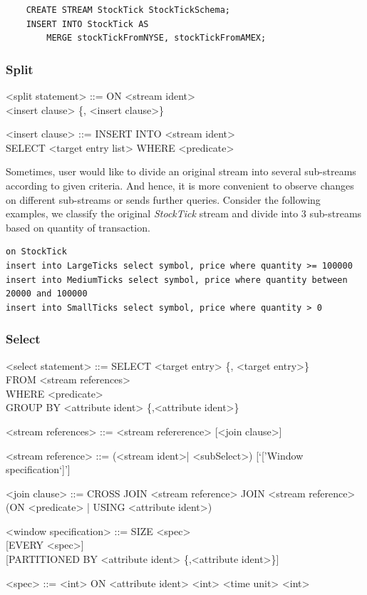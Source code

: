\begin{verbatim}
	CREATE STREAM StockTick StockTickSchema;
	INSERT INTO StockTick AS 
		MERGE stockTickFromNYSE, stockTickFromAMEX;
\end{verbatim}


\subsubsection{Split}
\begin{grammar}
<split statement> ::= ON <stream ident> \\
						<insert clause> \{, <insert clause>\}
						
<insert clause> ::= INSERT INTO <stream ident> \\SELECT <target entry list> WHERE <predicate>
\end{grammar}

Sometimes, user would like to divide an original stream into several sub-streams according to given criteria. And hence, it is more convenient to observe changes on different sub-streams or sends further queries. Consider the following examples, we classify the original \textit{StockTick} stream and divide into 3 sub-streams based on quantity of transaction.

\begin{verbatim}
on StockTick
insert into LargeTicks select symbol, price where quantity >= 100000
insert into MediumTicks select symbol, price where quantity between 20000 and 100000
insert into SmallTicks select symbol, price where quantity > 0
\end{verbatim}

\subsubsection{Select}
\begin{grammar}
<select statement> ::= SELECT <target entry> \{, <target entry>\}\\
	FROM <stream references> \\
	WHERE <predicate> \\
	GROUP BY <attribute ident> \{,<attribute ident>\}
	
<stream references> ::= <stream refererence> [<join clause>]

<stream reference> ::= (<stream ident>| <subSelect>) [`['Window specification`]']

<join clause> ::= CROSS JOIN <stream reference>
				\alt [INNER] JOIN <stream  reference> (ON <predicate> | USING <attribute ident>)

<window specification> ::= 
								SIZE <spec> \\
								{ }[EVERY <spec>]\\
								{ }[PARTITIONED BY <attribute ident> \{,<attribute ident>\}]

<spec> ::= <int> ON <attribute ident>
			\alt <int> <time unit>
			\alt <int>
\end{grammar}

